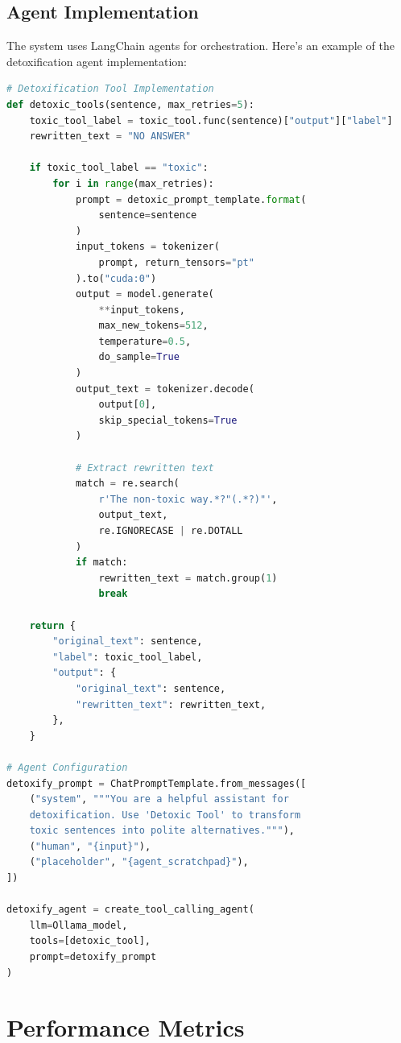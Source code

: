 \documentclass[11pt]{article}
\begin{document}
\subsection{Agent Implementation}
The system uses LangChain agents for orchestration. Here's an example of the detoxification agent implementation:

\begin{lstlisting}[language=Python]
# Detoxification Tool Implementation
def detoxic_tools(sentence, max_retries=5):
    toxic_tool_label = toxic_tool.func(sentence)["output"]["label"]
    rewritten_text = "NO ANSWER"

    if toxic_tool_label == "toxic":
        for i in range(max_retries):
            prompt = detoxic_prompt_template.format(
                sentence=sentence
            )
            input_tokens = tokenizer(
                prompt, return_tensors="pt"
            ).to("cuda:0")
            output = model.generate(
                **input_tokens, 
                max_new_tokens=512,
                temperature=0.5,
                do_sample=True
            )
            output_text = tokenizer.decode(
                output[0], 
                skip_special_tokens=True
            )
            
            # Extract rewritten text
            match = re.search(
                r'The non-toxic way.*?"(.*?)"', 
                output_text, 
                re.IGNORECASE | re.DOTALL
            )
            if match:
                rewritten_text = match.group(1)
                break

    return {
        "original_text": sentence,
        "label": toxic_tool_label,
        "output": {
            "original_text": sentence,
            "rewritten_text": rewritten_text,
        },
    }

# Agent Configuration
detoxify_prompt = ChatPromptTemplate.from_messages([
    ("system", """You are a helpful assistant for 
    detoxification. Use 'Detoxic Tool' to transform
    toxic sentences into polite alternatives."""),
    ("human", "{input}"),
    ("placeholder", "{agent_scratchpad}"),
])

detoxify_agent = create_tool_calling_agent(
    llm=Ollama_model, 
    tools=[detoxic_tool], 
    prompt=detoxify_prompt
)
\end{lstlisting}

\section{Performance Metrics}
\end{document}
